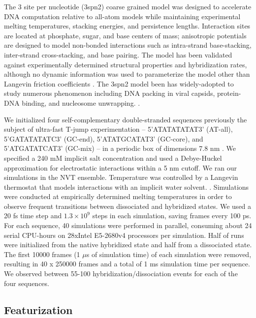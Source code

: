 \documentclass[journal=jpcbfk,manuscript=article]{achemso}
\begin{document}
The 3 site per nucleotide (3spn2) coarse grained model was designed to accelerate DNA computation relative to all-atom models while maintaining experimental melting temperatures, stacking energies, and persistence lengths\citep{Hinckley2013AnHybridization}. Interaction sites are located at phosphate, sugar, and base centers of mass; anisotropic potentials are designed to model non-bonded interactions such as intra-strand base-stacking, inter-strand cross-stacking, and base pairing. The model has been validated against experimentally determined structural properties and hybridization rates, although no dynamic information was used to parameterize the model other than Langevin friction coefficients \citep{Hinckley2013AnHybridization, Hinckley2014Coarse-grainedEffects}. The 3spn2 model been has widely-adopted to study numerous phenomenon including DNA packing in viral capsids, protein-DNA binding, and nucleosome unwrapping. \citep{Cordoba2017AIons, Lu2020OpenAWSEMSummary, Lequieu2016Tension-dependentUnwrapping}. 

We initialized four self-complementary double-stranded sequences previously the subject of ultra-fast T-jump experimentation -- 5'ATATATATAT3' (AT-all), 5'GATATATATC3' (GC-end), 5'ATATGCATAT3' (GC-core), and 5'ATGATATCAT3' (GC-mix) -- in a periodic box of dimensions 7.8 nm \citep{Sanstead2016, Phys2014}. We specified a 240 mM implicit salt concentration and used a Debye-Huckel approximation for electrostatic interactions within a 5 nm cutoff. We ran our simulations in the NVT ensemble. Temperature was controlled by a Langevin thermostat that models interactions with an implicit water solvent. \citep{Schneider1978Molecular-dynamicsTransitions}. Simulations were conducted at empirically determined  melting temperatures in order to observe frequent transitions between dissociated and hybridized states. We used a 20 fs time step and $1.3\times10^{9}$ steps in each simulation, saving frames every 100 ps. For each sequence, 40 simulations were performed in parallel, consuming about 24 serial CPU-hours on 28xIntel E5-2680v4 processors per simulation. Half of runs were initialized from the native hybridized state and half from a dissociated state. The first 10000 frames (1 $\mu$s of simulation time) of each simulation were removed, resulting in 40 x 250000 frames and a total of 1 ms simulation time per sequence. We observed between 55-100 hybridization/dissociation events for each of the four sequences.

\subsection{\label{sec:methods}Featurization}
\end{document}
